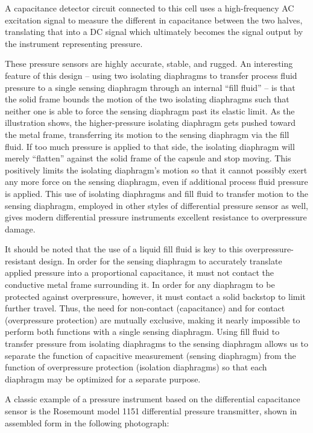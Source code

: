 A capacitance detector circuit connected to this cell uses a high-frequency AC excitation signal to measure the different in capacitance between the two halves, translating that into a DC signal which ultimately becomes the signal output by the instrument representing pressure.

These pressure sensors are highly accurate, stable, and rugged.  An interesting feature of this design -- using two isolating diaphragms to transfer process fluid pressure to a single sensing diaphragm through an internal ``fill fluid'' -- is that the solid frame bounds the motion of the two isolating diaphragms such that neither one is able to force the sensing diaphragm past its elastic limit.  As the illustration shows, the higher-pressure isolating diaphragm gets pushed toward the metal frame, transferring its motion to the sensing diaphragm via the fill fluid.  If too much pressure is applied to that side, the isolating diaphragm will merely ``flatten'' against the solid frame of the capsule and stop moving.  This positively limits the isolating diaphragm's motion so that it cannot possibly exert any more force on the sensing diaphragm, even if additional process fluid pressure is applied.  This use of isolating diaphragms and fill fluid to transfer motion to the sensing diaphragm, employed in other styles of differential pressure sensor as well, gives modern differential pressure instruments excellent resistance to overpressure damage.

It should be noted that the use of a liquid fill fluid is key to this overpressure-resistant design.  In order for the sensing diaphragm to accurately translate applied pressure into a proportional capacitance, it must not contact the conductive metal frame surrounding it.  In order for any diaphragm to be protected against overpressure, however, it must contact a solid backstop to limit further travel.  Thus, the need for non-contact (capacitance) and for contact (overpressure protection) are mutually exclusive, making it nearly impossible to perform both functions with a single sensing diaphragm.  Using fill fluid to transfer pressure from isolating diaphragms to the sensing diaphragm allows us to separate the function of capacitive measurement (sensing diaphragm) from the function of overpressure protection (isolation diaphragms) so that each diaphragm may be optimized for a separate purpose.  

\filbreak

A classic example of a pressure instrument based on the differential capacitance sensor is the Rosemount model 1151 differential pressure transmitter, shown in assembled form in the following photograph: 

